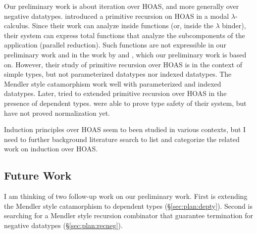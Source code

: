 Our preliminary work is about iteration over HOAS, and more generally over
negative datatypes. \citet{DesPfeSch97} introduced a primitive recursion
on HOAS in a modal $\lambda$-calculus. Since their work can analyze inside
functions (or, inside the $\lambda$ binder), their system can express
total functions that analyze the subcomponents of the application
(\eg parallel reduction). Such functions are not expressible in
our preliminary work \cite{AhnShe11} and in the work by \citet{FegShe96} and
\citet{MeiHut95}, which our preliminary work is based on.
However, their study of primitive recursion over HOAS is in the context of
simple types, but not parameterized datatypes nor indexed datatypes.
The Mendler style catamorphism work well with parameterized and
indexed datatypes. Later, \citet{DesLel99} tried to extended
primitive recursion over HOAS in the presence of dependent types.
\citet{DesLel99} were able to prove type safety of their system,
but have not proved normalization yet.

Induction principles over HOAS seem to been studied in various contexts,
but I need to further background literature search to list and categorize
the related work on induction over HOAS.

\subsection{Future Work} \label{ssec:MendlerFW}
I am thinking of two follow-up work on our preliminary work.
First is extending the Mendler style catamorphism to dependent types
(\S\ref{sec:plan:depty}).
Second is searching for a Mendler style recursion combinator that
guarantee termination for negative datatypes (\S\ref{sec:plan:recneg}).

